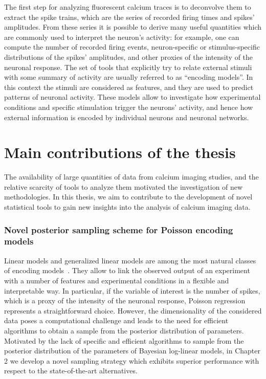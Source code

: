 The first step for analyzing fluorescent calcium traces is to deconvolve them to extract the spike trains, which are the series of recorded firing times and spikes' amplitudes.
From these series it is possible to derive many useful quantities which are commonly used to interpret the neuron's activity: for example, one can compute the number of recorded firing events, neuron-specific or stimulus-specific distributions of the spikes' amplitudes, and other proxies of the intensity of the neuronal response.
The set of tools that explicitly try to relate external stimuli with some summary of activity are usually referred to as ``encoding models''. In this context the stimuli are considered as features, and they are used to predict patterns of neuronal activity. These models allow to investigate how experimental conditions and specific stimulation trigger the neurons' activity, and hence how external information is encoded by individual neurons and neuronal networks.



\section*{Main contributions of the thesis}
The availability of large quantities of data from calcium imaging studies, and the relative scarcity of tools to analyze them motivated the investigation of new methodologies.
In this thesis, we aim to contribute to the development of novel statistical tools to gain new insights into the analysis of calcium imaging data.

\subsubsection{Novel posterior sampling scheme for Poisson encoding models}
Linear models and generalized linear models are among the most natural classes of encoding models~\citep{paninski2007}. They allow to link the observed output of an experiment with a number of features and experimental conditions in a flexible and interpretable way. In particular, if the variable of interest is the number of spikes, which is a proxy of the intensity of the neuronal response, Poisson regression represents a straightforward choice. However, the dimensionality of the considered data poses a computational challenge and leads to the need for efficient algorithms to obtain a sample from the posterior distribution of parameters. 
Motivated by the lack of specific and efficient algorithms to sample from the posterior distribution of the parameters
of Bayesian log-linear models, in Chapter 2 we develop a novel sampling strategy which exhibits superior performance with respect to the state-of-the-art alternatives. 

